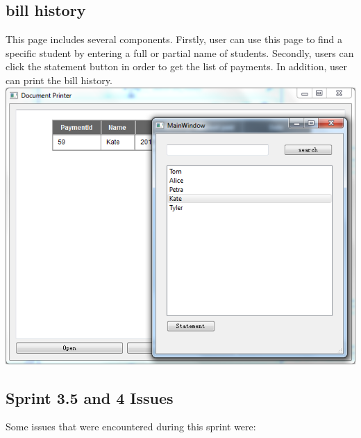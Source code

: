 \subsection{bill history}
This page includes several components. Firstly, user can use this page to find a specific student by entering a full or partial name of students. Secondly, users can click the statement button in order to get the list of payments. In addition, user can print the bill history.\\

\includegraphics[scale=0.5]{billHistory.png}

\subsection{Sprint 3.5 and 4 Issues}
Some issues that were encountered during this sprint were:


